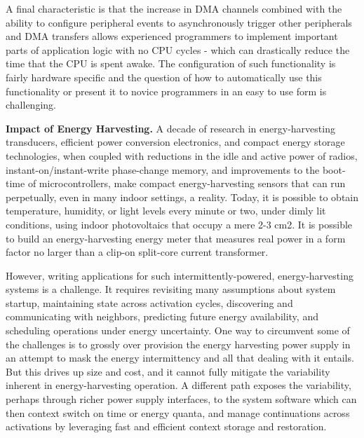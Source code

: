 A final characteristic is that the increase in DMA channels combined with the
ability to configure peripheral events to asynchronously trigger other
peripherals and DMA transfers allows experienced programmers to implement
important parts of application logic with no CPU cycles - which can
drastically reduce the time that the CPU is spent awake. The configuration of
such functionality is fairly hardware specific and the question of how to
automatically use this functionality or present it to novice programmers in an
easy to use form is challenging.

\smallskip\noindent
\textbf{Impact of Energy Harvesting.}
A decade of research in energy-harvesting transducers, efficient power
conversion electronics, and compact energy storage technologies, when coupled
with reductions in the idle and active power of radios,
instant-on/instant-write phase-change memory, and improvements to the
boot-time of microcontrollers, make compact energy-harvesting sensors that can
run perpetually, even in many indoor settings, a reality.  Today, it is
possible to obtain temperature, humidity, or light levels every minute or two,
under dimly lit conditions, using indoor photovoltaics that occupy a mere 2-3
cm2.  It is possible to build an energy-harvesting energy meter that measures
real power in a form factor no larger than a clip-on split-core current
transformer.

However, writing applications for such intermittently-powered,
energy-harvesting systems is a challenge.  It requires revisiting many
assumptions about system startup, maintaining state across activation cycles,
discovering and communicating with neighbors, predicting future energy
availability, and scheduling operations under energy uncertainty.  One way to
circumvent some of the challenges is to grossly over provision the energy
harvesting power supply in an attempt to mask the energy intermittency and all
that dealing with it entails.  But this drives up size and cost, and it cannot
fully mitigate the variability inherent in energy-harvesting operation.  A
different path exposes the variability, perhaps through richer power supply
interfaces, to the system software which can then context switch on time or
energy quanta, and manage continuations across activations by leveraging fast
and efficient context storage and restoration.


